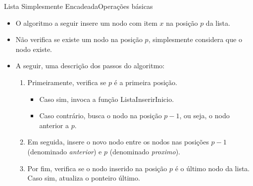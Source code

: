 \documentclass[aspectratio=169]{beamer}
\begin{document}
\begin{frame}{Lista Simplesmente Encadeada}{Operações básicas}
\begin{itemize}
 \item O algoritmo a seguir insere um nodo com item $x$ na posição $p$ da lista.
 \item Não verifica se existe um nodo na posição $p$, simplesmente considera que o nodo existe.
 \item A seguir, uma descrição dos passos do algoritmo:
 \begin{enumerate}
    \item Primeiramente, verifica se $p$ é a primeira posição.
    \begin{itemize}
      \item Caso sim, invoca a função ListaInserirInicio.
      \item Caso contrário, busca o nodo na posição $p-1$, ou seja, o nodo anterior a $p$.
    \end{itemize}       
    \item Em seguida, insere o novo nodo entre os nodos nas posições $p-1$ (denominado {\it anterior}) e $p$ (denominado {\it proximo}).
    \item Por fim, verifica se o nodo inserido na posição $p$ é o último nodo da lista. Caso sim, atualiza o ponteiro último.
 \end{enumerate}
\end{itemize} 
\end{frame}

\end{document}
